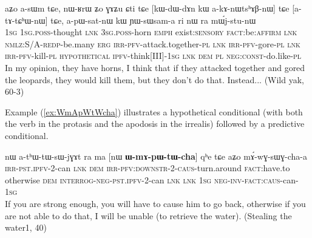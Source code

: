 \documentclass[oldfontcommands,oneside,a4paper,11pt]{article}
\newcommand{\ipa}[1]{{\phon \mbox{#1}}} %
\newcommand{\refb}[1]{(\ref{#1})}
\begin{document}
\begin{exe}
\ex \label{ex:akAnWtshABnW}
\gll 
 \ipa{aʑo}  	\ipa{a-sɯm}  	\ipa{tɕe,}  	\ipa{nɯ-ʁrɯ}  	\ipa{ʑo}  	\ipa{ɣɤʑu}  	\ipa{ɕti}  	\ipa{tɕe}  [\ipa{kɯ-dɯ-dɤn}  	\ipa{kɯ}  \ipa{a-kɤ-nɯtsʰɤβ-nɯ}]  	\ipa{tɕe}  	[\ipa{a-tɤ-tɕʰɯ-nɯ}]  	\ipa{tɕe,}  \ipa{a-pɯ-sat-nɯ}  	\ipa{kɯ}  	\ipa{ɲɯ-sɯsam-a}  \ipa{ri} \ipa{nɯ} \ipa{ra}  	\ipa{mɯ́j-stu-nɯ}  \\
 \textsc{1sg} \textsc{1sg.poss}-thought \textsc{lnk} \textsc{3sg.poss}-horn \textsc{emph} exist:\textsc{sensory} \textsc{fact}:be:\textsc{affirm} \textsc{lnk} \textsc{nmlz}:S/A-\textsc{redp}-be.many \textsc{erg} \textsc{irr-pfv}-attack.together-\textsc{pl} \textsc{lnk}  \textsc{irr-pfv}-gore-\textsc{pl} \textsc{lnk}  \textsc{irr-pfv}-kill-\textsc{pl} \textsc{hypothetical} \textsc{ipfv}-think[III]-\textsc{1sg} \textsc{lnk} \textsc{dem} \textsc{pl} \textsc{neg:const}-do.like-\textsc{pl} \\
\glt In my opinion, they have horns, I think that if they attacked together and gored the leopards, they would kill them, but they don't do that. Instead... (Wild yak, 60-3)
\end{exe} 

Example  \refb{ex:WmApWtWcha} illustrates a hypothetical conditional  (with both the verb in the protasis and the apodosis in the irrealis) followed by a predictive conditional.

\begin{exe}
\ex \label{ex:WmApWtWcha}
\gll 
[\textbf{\ipa{a-pɯ-tɯ-cha}}]  	\ipa{nɤ,}  	\ipa{nɯ}  	\ipa{a-tʰɯ-tɯ-sɯ-jɣɤt}  	\ipa{ra}  	\ipa{ma}  	[\ipa{nɯ}  	\textbf{\ipa{ɯ-mɤ-pɯ-tɯ-cha}}]  	\ipa{qʰe}  	\ipa{tɕe}  	\ipa{aʑo}  	\ipa{mɤ́-wɣ-sɯɣ-cha-a}  	  \\
\textsc{irr-pst.ipfv-2}-can \textsc{lnk} \textsc{dem} \textsc{irr-pfv:downstr-2-caus}-turn.around \textsc{fact}:have.to otherwise
\textsc{dem}  \textsc{interrog-neg-pst.ipfv}-2-can \textsc{lnk} \textsc{lnk} \textsc{1sg} \textsc{neg-inv-fact:caus}-can-\textsc{1sg} \\
\glt If you are strong enough, you will have to cause him to go back, otherwise if you are not able to do that, I will be unable (to retrieve the water). (Stealing the water1, 40)
\end{exe} 
\end{document}
